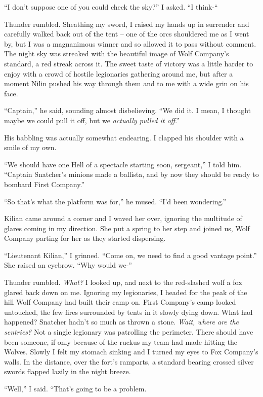 \documentclass[12pt, openany]{book}
\begin{document}
“I don’t suppose one of you could check the sky?” I asked. “I think-“

Thunder rumbled. Sheathing my sword, I raised my hands up in surrender and carefully walked back out of the tent – one of the orcs shouldered me as I went by, but I was a magnanimous winner and so allowed it to pass without comment. The night sky was streaked with the beautiful image of Wolf Company’s standard, a red streak across it. The sweet taste of victory was a little harder to enjoy with a crowd of hostile legionaries gathering around me, but after a moment Nilin pushed his way through them and to me with a wide grin on his face.

“Captain,” he said, sounding almost disbelieving. “We did it. I mean, I thought maybe we could pull it off, but we \textit{actually pulled it off}.”

His babbling was actually somewhat endearing. I clapped his shoulder with a smile of my own.

“We should have one Hell of a spectacle starting soon, sergeant,” I told him. “Captain Snatcher’s minions made a ballista, and by now they should be ready to bombard First Company.”

“So that’s what the platform was for,” he mused. “I’d been wondering.”

Kilian came around a corner and I waved her over, ignoring the multitude of glares coming in my direction. She put a spring to her step and joined us, Wolf Company parting for her as they started dispersing.

“Lieutenant Kilian,” I grinned. “Come on, we need to find a good vantage point.”
She raised an eyebrow. “Why would we-”

Thunder rumbled. \textit{What?} I looked up, and next to the red-slashed wolf a fox glared back down on me. Ignoring my legionaries, I headed for the peak of the hill Wolf Company had built their camp on. First Company’s camp looked untouched, the few fires surrounded by tents in it slowly dying down. What had happened? Snatcher hadn’t so much as thrown a stone. \textit{Wait, where are the sentries?} Not a single legionary was patrolling the perimeter. There should have been someone, if only because of the ruckus my team had made hitting the Wolves. Slowly I felt my stomach sinking and I turned my eyes to Fox Company’s walls. In the distance, over the fort’s ramparts, a standard bearing crossed silver swords flapped lazily in the night breeze.

“Well,” I said. “That’s going to be a problem.
\clearpage
\end{document}
